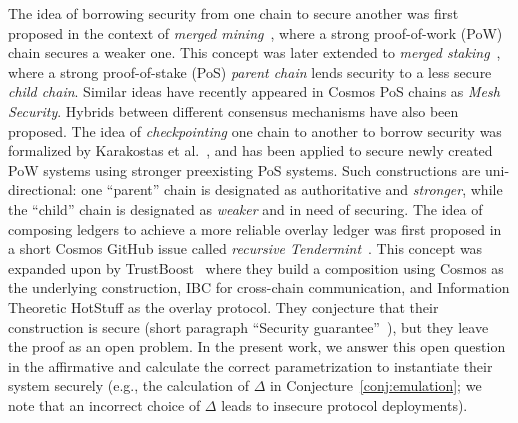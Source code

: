 The idea of borrowing security from one chain to
secure another was first proposed in the context of \emph{merged mining}~\cite{namecoin}, where
a strong proof-of-work (PoW) chain secures a weaker one. This
concept was later extended to \emph{merged staking}~\cite{pos-sidechains}, where a
strong proof-of-stake (PoS) \emph{parent chain} lends security to a less secure
\emph{child chain}. Similar ideas have recently appeared in Cosmos PoS
chains as \emph{Mesh Security}. Hybrids between different consensus mechanisms
have also been proposed. The idea of \emph{checkpointing}
one chain to another to borrow security was formalized by Karakostas et al.~\cite{karakostas2021securing},
and has been applied to secure newly created PoW systems using stronger
preexisting PoS systems. Such constructions are uni-directional:
one ``parent'' chain is designated as authoritative and \emph{stronger},
while the ``child'' chain is designated as \emph{weaker} and in need of securing.
The idea of composing ledgers to achieve a more reliable overlay ledger
was first proposed in a short Cosmos GitHub issue called
\emph{recursive Tendermint}~\cite{recursive-tendermint}.
This concept was expanded upon by TrustBoost~\cite{trustboost}
where they build a composition using Cosmos as the underlying
construction, IBC for cross-chain communication, and Information Theoretic
HotStuff as the overlay protocol. They conjecture that their construction
is secure (short paragraph ``Security guarantee''~\cite[Section 4.1]{trustboost}),
but they leave the proof as an open problem. In the present work, we
answer this open question in the affirmative and calculate the correct
parametrization to instantiate their system securely (e.g., the calculation
of $\Delta$ in Conjecture~\ref{conj:emulation}; we note that an incorrect
choice of $\Delta$ leads to insecure protocol deployments).

